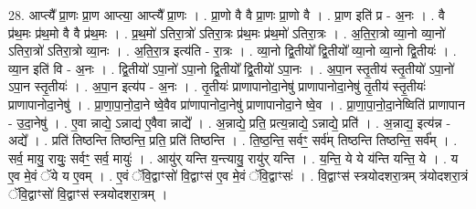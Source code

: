 \documentclass[17pt]{extarticle}
\begin{document}
28. आप्त्यै᳚ प्रा॒णः प्रा॒ण आप्त्या॒ आप्त्यै᳚ प्रा॒णः । . प्रा॒णो वै वै प्रा॒णः प्रा॒णो वै । . प्रा॒ण इति॑ प्र - अ॒नः । . वै प्र॑थ॒मः प्र॑थ॒मो वै वै प्र॑थ॒मः । . प्र॒थ॒मो॑ ऽतिरा॒त्रो॑ ऽतिरा॒त्रः प्र॑थ॒मः प्र॑थ॒मो॑ ऽतिरा॒त्रः । . अ॒ति॒रा॒त्रो व्या॒नो व्या॒नो॑ ऽतिरा॒त्रो॑ ऽतिरा॒त्रो व्या॒नः । . अ॒ति॒रा॒त्र इत्य॑ति - रा॒त्रः । . व्या॒नो द्वि॒तीयो᳚ द्वि॒तीयो᳚ व्या॒नो व्या॒नो द्वि॒तीयः॑ । . व्या॒न इति॑ वि - अ॒नः । . द्वि॒तीयो॑ ऽपा॒नो॑ ऽपा॒नो द्वि॒तीयो᳚ द्वि॒तीयो॑ ऽपा॒नः । . अ॒पा॒न स्तृ॒तीय॑ स्तृ॒तीयो॑ ऽपा॒नो॑ ऽपा॒न स्तृ॒तीयः॑ । . अ॒पा॒न इत्य॑प - अ॒नः । . तृ॒तीयः॑ प्राणापानोदा॒नेषु॑ प्राणापानोदा॒नेषु॑ तृ॒तीय॑ स्तृ॒तीयः॑ प्राणापानोदा॒नेषु॑ । . प्रा॒णा॒पा॒नो॒दा॒ने ष्वे॒वैव प्रा॑णापानोदा॒नेषु॑ प्राणापानोदा॒ने ष्वे॒व । . प्रा॒णा॒पा॒नो॒दा॒नेष्विति॑ प्राणापान - उ॒दा॒नेषु॑ । . ए॒वा न्नाद्ये॒ ऽन्नाद्य॑ ए॒वैवा न्नाद्ये᳚ । . अ॒न्नाद्ये॒ प्रति॒ प्रत्य॒न्नाद्ये॒ ऽन्नाद्ये॒ प्रति॑ । . अ॒न्नाद्य॒ इत्य॑न्न - अद्ये᳚ । . प्रति॑ तिष्ठन्ति तिष्ठन्ति॒ प्रति॒ प्रति॑ तिष्ठन्ति । . ति॒ष्ठ॒न्ति॒ सर्वꣳ॒॒ सर्व॑म् तिष्ठन्ति तिष्ठन्ति॒ सर्व᳚म् । . सर्व॒ मायु॒ रायुः॒ सर्वꣳ॒॒ सर्व॒ मायुः॑ । . आयु॑र् यन्ति य॒न्त्यायु॒ रायु॑र् यन्ति । . य॒न्ति॒ ये ये य॑न्ति यन्ति॒ ये । . य ए॒व मे॒वं ॅये य ए॒वम् । . ए॒वं ॅवि॒द्वाꣳसो॑ वि॒द्वाꣳस॑ ए॒व मे॒वं ॅवि॒द्वाꣳसः॑ । . वि॒द्वाꣳस॑ स्त्रयोदशरा॒त्रम् त्र॑योदशरा॒त्रं ॅवि॒द्वाꣳसो॑ वि॒द्वाꣳस॑ स्त्रयोदशरा॒त्रम् । \newline
\end{document}

